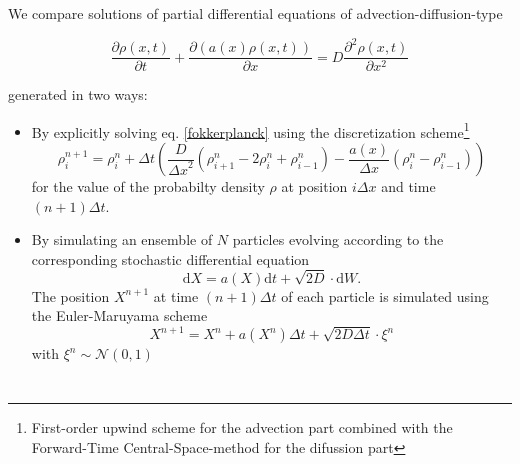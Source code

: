 \documentclass[]{article}
\title{}
\author{}
\newcommand{\pa}[2]{\frac{\partial #1}{\partial #2}}
\newcommand{\ppa}[2]{\frac{\partial^2 #1}{\partial #2^2}}
\newcommand{\dd}{\ensuremath{\mathrm{d}}}
\begin{document}
\maketitle

\begin{abstract}

\end{abstract}

We compare solutions of partial differential equations of advection-diffusion-type

\begin{equation}
\label{fokkerplanck}
\pa{\rho(x,t)}{t} + \pa{(a(x) \rho(x,t))}{x} = D  \ppa{\rho(x,t)}{x} 
\end{equation}

generated in two ways:
\begin{itemize}
\item By explicitly solving eq. \eqref{fokkerplanck} using the discretization scheme\footnote{First-order upwind scheme for the advection part combined with the Forward-Time Central-Space-method for the difussion part}
\begin{equation}
\rho_i^{n+1} = \rho_i^n + \Delta t \left( \frac{D}{{\Delta x}^2} \left( \rho_{i+1}^{n} - 2 \rho_i^n + \rho_{i-1}^n \right)  - \frac{a(x)}{\Delta x} (\rho_i^n - \rho_{i-1}^n) \right)
\end{equation}
for the value of the probabilty density $\rho$ at position $i \Delta x$ and time $(n+1) \Delta t$.
\item By simulating an ensemble of $N$ particles evolving according to the corresponding stochastic differential equation  
\begin{equation}
    \dd X = a(X) \dd t + \sqrt{2D} \cdot \dd{W}.
\end{equation}
 The position $X^{n+1}$ at time $ (n+1) \Delta t$ of each  particle is simulated using the  Euler-Maruyama scheme
\begin{equation}
   X^{n + 1} = X^{n} + a(X^n) \Delta t +  \sqrt{2D \Delta t}\cdot \xi^n 
\end{equation}
with $\xi^n  \sim \mathcal{N} (0,1)$
\end{itemize}






\section{}
\end{document}
